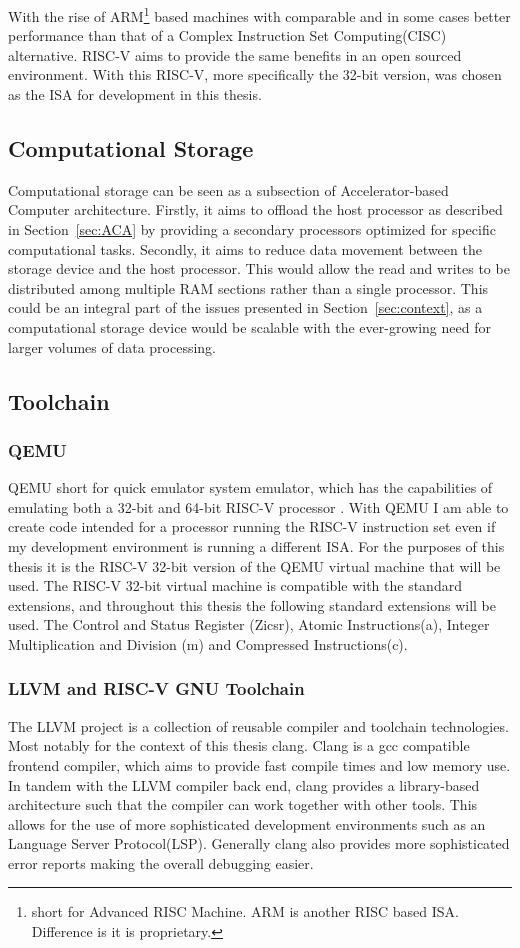 With the rise of ARM\footnote{short for Advanced RISC Machine. ARM is another
RISC based ISA. Difference is it is proprietary.} based machines with comparable
and in some cases better performance than that of a Complex Instruction Set
Computing(CISC) alternative\cite{Power_Struggle}. RISC-V aims to provide the
same benefits in an open sourced environment. With this RISC-V, more
specifically the 32-bit version, was chosen as the ISA for development in this
thesis.

\subsection{Computational Storage}
Computational storage can be seen as a subsection of Accelerator-based Computer
architecture. Firstly, it aims to offload the host processor as described in
Section~\ref{sec:ACA} by providing a secondary processors optimized for specific
computational tasks. Secondly, it aims to reduce data movement between the
storage device and the host processor. This would allow the read and writes to
be distributed among multiple RAM sections rather than a single processor. This
could be an integral part of the issues presented in Section~\ref{sec:context},
as a computational storage device would be scalable with the ever-growing need
for larger volumes of data processing.


\subsection{Toolchain}
\subsubsection*{QEMU}
QEMU short for quick emulator system emulator, which has the capabilities of
emulating both a 32-bit and 64-bit RISC-V processor \cite{QEMU}. With QEMU I am
able to create code intended for a processor running the RISC-V instruction set
even if my development environment is running a different ISA. For the purposes
of this thesis it is the RISC-V 32-bit version of the QEMU virtual machine that
will be used. The RISC-V 32-bit virtual machine is compatible with the standard
extensions, and throughout this thesis the following standard extensions will be
used. The Control and Status Register (Zicsr), Atomic Instructions(a), Integer
Multiplication and Division (m) and Compressed Instructions(c).

\subsubsection*{LLVM and RISC-V GNU Toolchain}
The LLVM project is a collection of reusable compiler and toolchain
technologies. Most notably for the context of this thesis clang. Clang is a gcc
compatible frontend compiler, which aims to provide fast compile times and low
memory use. In tandem with the LLVM compiler back end, clang provides a
library-based architecture such that the compiler can work together with other
tools. This allows for the use of more sophisticated development environments
such as an Language Server Protocol(LSP). Generally clang also provides more
sophisticated error reports making the overall debugging easier.


